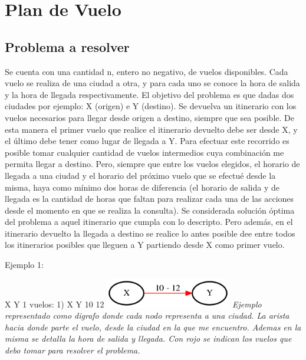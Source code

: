 \documentclass[a4paper]{article}
\begin{document}
\section{Plan de Vuelo}
\subsection{Problema a resolver}

Se cuenta con una cantidad n, entero no negativo, de vuelos disponibles. Cada vuelo se realiza de una ciudad a otra, y para cada uno se conoce la hora de salida y la hora de llegada respectivamente.
 El objetivo del problema es que dadas dos ciudades por ejemplo: X (origen) e  Y (destino).  Se devuelva un itinerario con los vuelos necesarios para llegar desde origen a destino, siempre que sea posible.  De esta manera el primer vuelo que realice el itinerario devuelto debe ser desde X, y el último debe tener como lugar de llegada a Y. Para efectuar este recorrido es posible tomar cualquier cantidad de vuelos intermedios cuya combinación me permita llegar a destino. Pero, siempre que entre los vuelos elegidos, el horario de  llegada a una ciudad y el horario del próximo vuelo que se efectué  desde la misma, haya como mínimo dos horas de diferencia (el horario de salida y de llegada es la cantidad de horas que faltan para realizar cada una de las acciones desde el momento en que se realiza la consulta). 
Se considerada solución óptima del problema a aquel itinerario que cumpla con lo descripto. Pero además, en el itinerario devuelto la llegada a destino se realice lo antes posible dee entre todos los itinerarios posibles que lleguen a Y partiendo desde X como primer vuelo.\newline

Ejemplo 1:

X Y 1\newline
vuelos:
1) X Y 10 12\newline
\vspace{1cm}
\includegraphics[width=\textwidth,height=0.5in,keepaspectratio
]{ejemplo1.png}\newline
\textit{Ejemplo representado como digrafo donde cada nodo representa a una ciudad. La arista hacia donde parte el vuelo, desde la ciudad en la que me encuentro. Ademas en la misma se detalla la hora de salida y llegada. Con rojo se indican los vuelos que debo tomar para resolver el problema.} \newline
\end{document}
